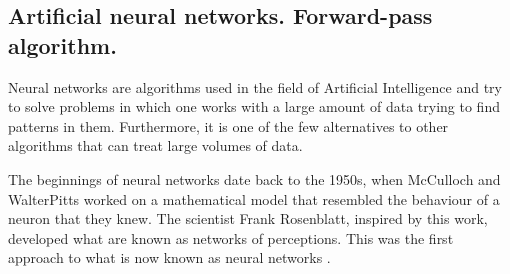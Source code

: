 \subsection{Artificial neural networks. Forward-pass algorithm.}

Neural networks are algorithms used in the field of Artificial Intelligence and try to solve problems in which one works with a large amount of data trying to find patterns in them. Furthermore, it is one of the few alternatives to other algorithms that can treat large volumes of data.
\newline

The beginnings of neural networks date back to the 1950s, when McCulloch and WalterPitts \cite{kleene} worked on a mathematical model that resembled the behaviour of a neuron that they knew. The scientist Frank Rosenblatt, inspired by this work, developed what are known as networks of perceptions. This was the first approach to what is now known as neural networks \cite{nielsen}.







